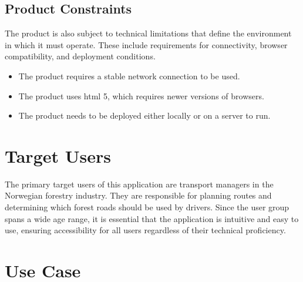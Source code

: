 \subsection{Product Constraints}

The product is also subject to technical limitations that define the environment in which it must operate. These include requirements for connectivity, browser compatibility, and deployment conditions.

\begin{itemize}
    \item The product requires a stable network connection to be used.
    \item The product uses \acrshort{html} 5, which requires newer versions of browsers.
    \item The product needs to be deployed either locally or on a server to run.
\end{itemize}

\section{Target Users}

The primary target users of this application are transport managers in the Norwegian forestry industry. They are responsible for planning routes and determining which forest roads should be used by drivers. Since the user group spans a wide age range, it is essential that the application is intuitive and easy to use, ensuring accessibility for all users regardless of their technical proficiency.

\section{Use Case}

